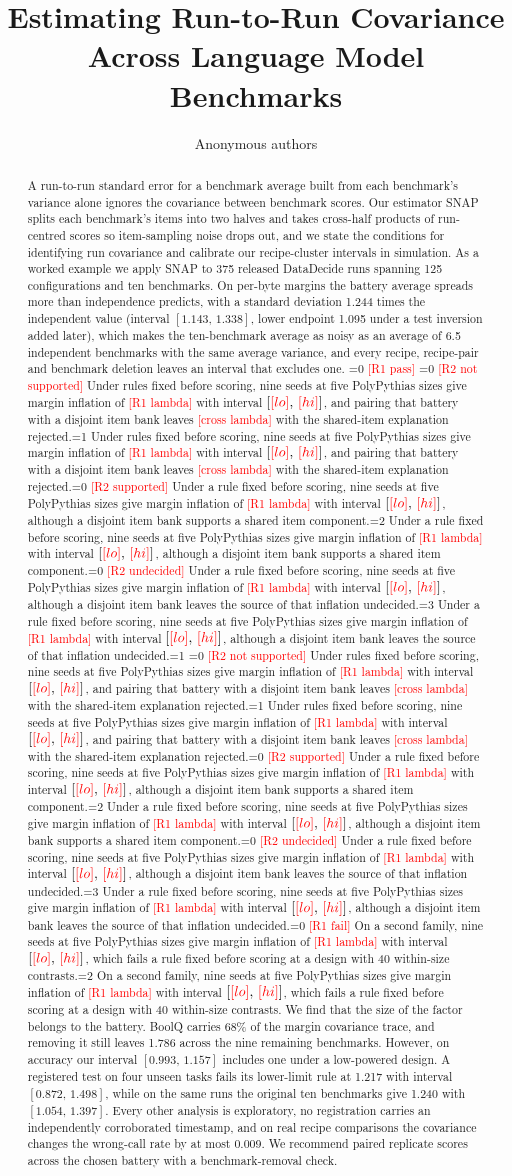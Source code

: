 \documentclass{article}
\title{Estimating Run-to-Run Covariance\\Across Language Model Benchmarks}
\author{Anonymous authors}
\newcommand{\ci}[2]{\ensuremath{[#1,\,#2]}}
\newcommand{\pending}[1]{\textcolor{red}{[#1]}}
\newcommand{\Ronecase}{0}
\newcommand{\Rtwocase}{0}
\newcommand{\outcome}[4]{\ifnum#1=0 \pending{#3} #4\else\ifnum#1=#2 #4\fi\fi}
\begin{document}
\maketitle
\begin{abstract}
A run-to-run standard error for a benchmark average built from each benchmark's variance alone ignores the covariance between benchmark scores. Our estimator SNAP splits each benchmark's items into two halves and takes cross-half products of run-centred scores so item-sampling noise drops out, and we state the conditions for identifying run covariance and calibrate our recipe-cluster intervals in simulation. As a worked example we apply SNAP to 375 released DataDecide runs spanning 125 configurations and ten benchmarks. On per-byte margins the battery average spreads more than independence predicts, with a standard deviation 1.244 times the independent value (interval \ci{1.143}{1.338}, lower endpoint 1.095 under a test inversion added later), which makes the ten-benchmark average as noisy as an average of 6.5 independent benchmarks with the same average variance, and every recipe, recipe-pair and benchmark deletion leaves an interval that excludes one. \outcome{\Ronecase}{1}{R1 pass}{\outcome{\Rtwocase}{1}{R2 not supported}{Under rules fixed before scoring, nine seeds at five PolyPythias sizes give margin inflation of \pending{R1 lambda} with interval \ci{\pending{lo}}{\pending{hi}}, and pairing that battery with a disjoint item bank leaves \pending{cross lambda} with the shared-item explanation rejected.}\outcome{\Rtwocase}{2}{R2 supported}{Under a rule fixed before scoring, nine seeds at five PolyPythias sizes give margin inflation of \pending{R1 lambda} with interval \ci{\pending{lo}}{\pending{hi}}, although a disjoint item bank supports a shared item component.}\outcome{\Rtwocase}{3}{R2 undecided}{Under a rule fixed before scoring, nine seeds at five PolyPythias sizes give margin inflation of \pending{R1 lambda} with interval \ci{\pending{lo}}{\pending{hi}}, although a disjoint item bank leaves the source of that inflation undecided.}}\outcome{\Ronecase}{2}{R1 fail}{On a second family, nine seeds at five PolyPythias sizes give margin inflation of \pending{R1 lambda} with interval \ci{\pending{lo}}{\pending{hi}}, which fails a rule fixed before scoring at a design with 40 within-size contrasts.} We find that the size of the factor belongs to the battery. BoolQ carries 68\% of the margin covariance trace, and removing it still leaves 1.786 across the nine remaining benchmarks. However, on accuracy our interval \ci{0.993}{1.157} includes one under a low-powered design. A registered test on four unseen tasks fails its lower-limit rule at 1.217 with interval \ci{0.872}{1.498}, while on the same runs the original ten benchmarks give 1.240 with \ci{1.054}{1.397}. Every other analysis is exploratory, no registration carries an independently corroborated timestamp, and on real recipe comparisons the covariance changes the wrong-call rate by at most 0.009. We recommend paired replicate scores across the chosen battery with a benchmark-removal check.
\end{abstract}
\end{document}
